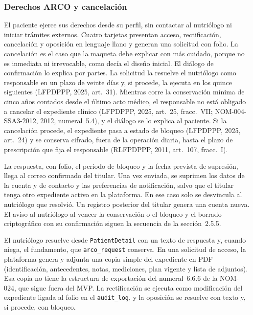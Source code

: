 \documentclass[12pt, a4paper]{article}
\begin{document}
\subsubsection{Derechos ARCO y cancelación}
 
El paciente ejerce sus derechos desde su perfil, sin contactar al
nutriólogo ni iniciar trámites externos. Cuatro tarjetas presentan
acceso, rectificación, cancelación y oposición en lenguaje llano y
generan una solicitud con folio. La cancelación es el caso que la
maqueta debe explicar con más cuidado, porque no es inmediata ni
irrevocable, como decía el diseño inicial. El diálogo de confirmación lo
explica por partes. La solicitud la resuelve el nutriólogo como
responsable en un plazo de veinte días y, si procede, la ejecuta en los
quince siguientes (LFPDPPP, 2025, art.~31). Mientras corre la
conservación mínima de cinco años contados desde el último acto médico,
el responsable no está obligado a cancelar el expediente clínico
(LFPDPPP, 2025, art.~25, fracc.~VII; NOM-004-SSA3-2012, 2012,
numeral~5.4), y el diálogo se lo explica al paciente. Si la cancelación
procede, el expediente pasa a estado de bloqueo (LFPDPPP, 2025, art.~24)
y se conserva cifrado, fuera de la operación diaria, hasta el plazo de
prescripción que fija el responsable (RLFPDPPP, 2011, art.~107,
fracc.~I).

La respuesta, con folio, el periodo de bloqueo y la fecha prevista de
supresión, llega al correo confirmado del titular. Una vez enviada, se
suprimen los datos de la cuenta y de contacto y las preferencias de
notificación, salvo que el titular tenga otro expediente activo en la
plataforma. En ese caso solo se desvincula al nutriólogo que resolvió.
Un registro posterior del titular genera una cuenta nueva. El aviso al
nutriólogo al vencer la conservación o el bloqueo y el borrado
criptográfico con su confirmación siguen la secuencia de la
sección~2.5.5.
 
El nutriólogo resuelve desde \texttt{PatientDetail} con un texto de
respuesta y, cuando niega, el fundamento, que \texttt{arco\_request}
conserva. En una solicitud de acceso, la plataforma genera y adjunta una
copia simple del expediente en PDF (identificación, antecedentes, notas,
mediciones, plan vigente y lista de adjuntos). Esa copia no tiene la
estructura de exportación del numeral~6.6.6 de la NOM-024, que sigue
fuera del MVP. La rectificación se ejecuta como modificación del
expediente ligada al folio en el \texttt{audit\_log}, y la oposición se
resuelve con texto y, si procede, con bloqueo.
\end{document}
